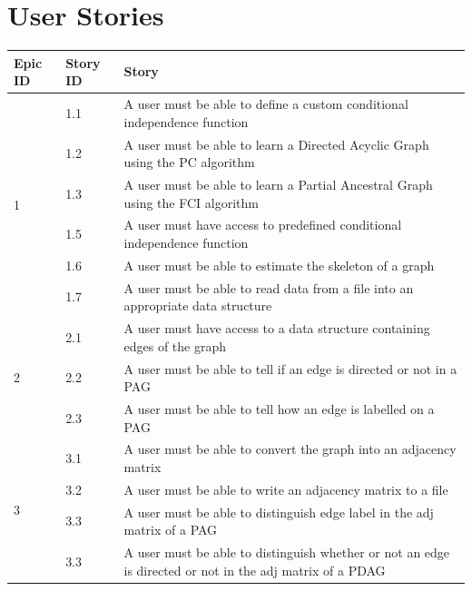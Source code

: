 \documentclass{UoYCSproject}
\begin{document}
\section{User Stories}
\begin{tabular}{| l | l | p{9.5cm} |}
	\hline
	Epic ID & Story ID & Story \\
	\hline
	\multirow{6}{*}{1} & 1.1 & A user must be able to define a custom conditional independence  function\\
	\cline{2-3}
	& 1.2 & A user  must be able to learn a Directed Acyclic Graph using  the PC algorithm \\
	\cline{2-3}
	& 1.3 & A user  must be able to learn a Partial  Ancestral Graph using  the FCI algorithm \\
	\cline{2-3}
	& 1.5 & A user must have access to  predefined conditional independence function \\
	\cline{2-3}
	& 1.6 & A user must be able to estimate the skeleton of a graph \\
	\cline{2-3}
	& 1.7 & A user must be able to read data from a file into an appropriate data structure \\
	\hline
	\multirow{3}{*}{2}
	& 2.1 & A user must have access to a data structure containing edges of the graph \\
	\cline{2-3}
	& 2.2 & A user must be able to tell if an edge is directed or not in a PAG \\
	\cline{2-3}
	& 2.3 & A user must be able to tell how an edge is labelled on a PAG \\
	\hline
	\multirow{4}{*}{3}
	& 3.1 & A user must be able to convert the graph into an adjacency matrix \\
	\cline{2-3}
	& 3.2 & A user must be able to write an adjacency matrix to a file \\
	\cline{2-3}
	& 3.3 & A user must be able to distinguish edge label in the adj matrix of a PAG \\
	\cline{2-3}
	& 3.3 & A user must be able to distinguish whether or not an edge is directed or not  in the adj matrix of a PDAG \\
	\hline
	
\end{tabular}
\end{document}
